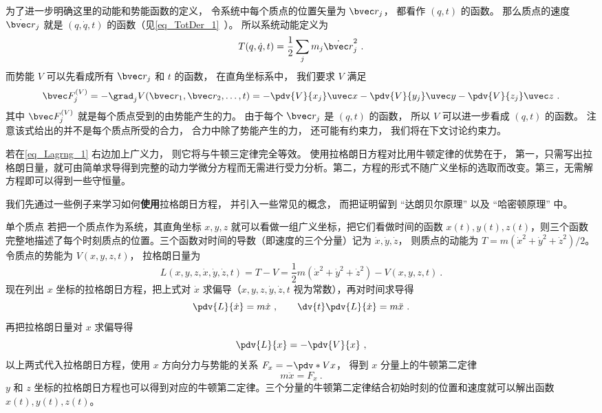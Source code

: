 为了进一步明确这里的动能和势能函数的定义， 令系统中每个质点的位置矢量为 $\bvec r_j$， 都看作 $(q, t)$ 的函数。 那么质点的速度 $\dot{\bvec r}_j$ 就是 $(q,\dot q, t)$ 的函数（见\autoref{eq_TotDer_1}~）。 所以系统动能定义为
\begin{equation}
T(q, \dot q, t) = \frac{1}{2}\sum_j m_j\dot {\bvec r}_j^2~.
\end{equation}
而势能 $V$ 可以先看成所有 $\bvec r_j$ 和 $t$ 的函数， 在直角坐标系中， 我们要求 $V$ 满足
\begin{equation}
\bvec F_j^{(V)} = - \grad_j V(\bvec r_1,\bvec r_2, \dots, t) = -\pdv{V}{x_j}\uvec x - \pdv{V}{y_j}\uvec y - \pdv{V}{z_j} \uvec z~.
\end{equation}
其中 $\bvec F_j^{(V)}$ 就是每个质点受到的由势能产生的力。 由于每个 $\bvec r_j$ 是 $(q, t)$ 的函数， 所以 $V$ 可以进一步看成 $(q, t)$ 的函数。 注意该式给出的并不是每个质点所受的合力， 合力中除了势能产生的力， 还可能有约束力， 我们将在下文讨论约束力。

若在\autoref{eq_Lagrng_1} 右边加上广义力， 则它将与牛顿三定律完全等效。 使用拉格朗日方程对比用牛顿定律的优势在于， 第一，只需写出拉格朗日量，就可由简单求导得到完整的动力学微分方程而无需进行受力分析。第二，方程的形式不随广义坐标的选取而改变。第三，无需解方程即可以得到一些守恒量。

我们先通过一些例子来学习如何\textbf{使用}拉格朗日方程， 并引入一些常见的概念， 而把证明留到 “达朗贝尔原理” 以及 “哈密顿原理” 中。

\begin{example}{单个质点}\label{ex_Lagrng_1}
若把一个质点作为系统，其直角坐标 $x,y,z$ 就可以看做一组广义坐标，把它们看做时间的函数 $x(t), y(t), z(t)$，则三个函数完整地描述了每个时刻质点的位置。三个函数对时间的导数（即速度的三个分量）记为 $\dot x, \dot y, \dot z$， 则质点的动能为 $T=m(\dot x^2+\dot y^2+\dot z^2)/2$。 令质点的势能为 $V(x,y,z,t)$， 拉格朗日量为
\begin{equation}
L(x,y,z, \dot x, \dot y, \dot z, t) = T-V = \frac12 m(\dot x^2+\dot y^2+\dot z^2) - V(x,y,z,t)~.
\end{equation}
现在列出 $x$ 坐标的拉格朗日方程，把上式对 $\dot x$ 求偏导（$x, y,z, \dot y, \dot z, t$ 视为常数），再对时间求导得
\begin{equation}
\pdv{L}{\dot x} = m\dot x~,
\qquad
\dv{t} \pdv{L}{\dot x} = m\ddot x~.
\end{equation}
再把拉格朗日量对 $x$ 求偏导得
\begin{equation}
\pdv{L}{x} = -\pdv{V}{x}~,
\end{equation}
以上两式代入拉格朗日方程，使用 $x$ 方向分力与势能的关系 $F_x = -\pdv*{V}{x}$， 得到 $x$ 分量上的牛顿第二定律
\begin{equation}
m\ddot x = F_x~.
\end{equation}
$y$ 和 $z$ 坐标的拉格朗日方程也可以得到对应的牛顿第二定律。三个分量的牛顿第二定律结合初始时刻的位置和速度就可以解出函数 $x(t), y(t), z(t)$。 
\end{example}

